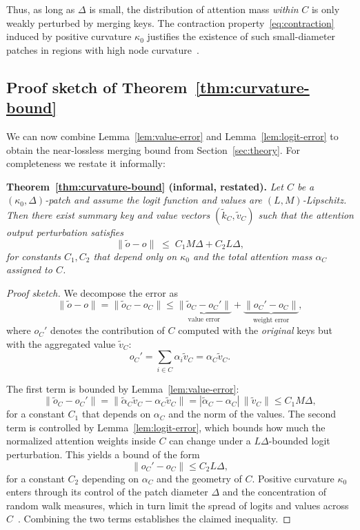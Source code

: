 \documentclass{article}
\theoremstyle{plain}
\theoremstyle{definition}
\theoremstyle{remark}
\begin{document}
Thus, as long as $\Delta$ is small, the distribution of attention mass \emph{within} $C$ is only weakly perturbed by merging keys. The contraction property~\eqref{eq:contraction} induced by positive curvature $\kappa_0$ justifies the existence of such small-diameter patches in regions with high node curvature~\citep{ollivier2009ricci,villani2009optimal}.

\subsection{Proof sketch of Theorem~\ref{thm:curvature-bound}}

We can now combine Lemma~\ref{lem:value-error} and Lemma~\ref{lem:logit-error} to obtain the near-lossless merging bound from Section~\ref{sec:theory}. For completeness we restate it informally:

\medskip
\noindent\textbf{Theorem~\ref{thm:curvature-bound} (informal, restated).}
\emph{Let $C$ be a $(\kappa_0,\Delta)$-patch and assume the logit function and values are $(L,M)$-Lipschitz. Then there exist summary key and value vectors $(\tilde{k}_C,\tilde{v}_C)$ such that the attention output perturbation satisfies}
\[
  \|\tilde{o} - o\|
  \;\le\; C_1 M \Delta + C_2 L \Delta,
\]
\emph{for constants $C_1,C_2$ that depend only on $\kappa_0$ and the total attention mass $\alpha_C$ assigned to $C$.}

\begin{proof}[Proof sketch]
We decompose the error as
\[
  \|\tilde{o} - o\|
  = \big\|\tilde{o}_C - o_C\big\|
  \le \underbrace{\big\|\tilde{o}_C - o_C'\big\|}_{\text{value error}} +
      \underbrace{\big\|o_C' - o_C\big\|}_{\text{weight error}},
\]
where $o_C'$ denotes the contribution of $C$ computed with the \emph{original} keys but with the aggregated value $\tilde{v}_C$:
\[
  o_C' = \sum_{i\in C} \alpha_i \tilde{v}_C = \alpha_C \tilde{v}_C.
\]

The first term is bounded by Lemma~\ref{lem:value-error}:
\[
  \big\|\tilde{o}_C - o_C'\big\| = \big\|\tilde{\alpha}_C \tilde{v}_C - \alpha_C \tilde{v}_C\big\|
  = |\tilde{\alpha}_C - \alpha_C|\, \|\tilde{v}_C\|
  \le C_1 M \Delta,
\]
for a constant $C_1$ that depends on $\alpha_C$ and the norm of the values. The second term is controlled by Lemma~\ref{lem:logit-error}, which bounds how much the normalized attention weights inside $C$ can change under a $L\Delta$-bounded logit perturbation. This yields a bound of the form
\[
  \big\|o_C' - o_C\big\|
  \le C_2 L \Delta,
\]
for a constant $C_2$ depending on $\alpha_C$ and the geometry of $C$. Positive curvature $\kappa_0$ enters through its control of the patch diameter $\Delta$ and the concentration of random walk measures, which in turn limit the spread of logits and values across $C$~\citep{ollivier2009ricci,villani2009optimal}. Combining the two terms establishes the claimed inequality.
\end{proof}
\end{document}
